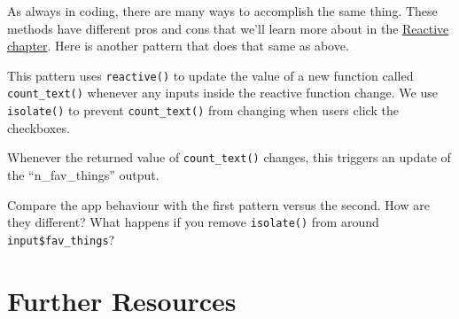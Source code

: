 \documentclass[
]{book}
\newenvironment{Shaded}{\begin{snugshade}}{\end{snugshade}}
\newcommand{\CommentTok}[1]{\textcolor[rgb]{0.56,0.35,0.01}{\textit{#1}}}
\newcommand{\ControlFlowTok}[1]{\textcolor[rgb]{0.13,0.29,0.53}{\textbf{#1}}}
\newcommand{\FunctionTok}[1]{\textcolor[rgb]{0.00,0.00,0.00}{#1}}
\newcommand{\NormalTok}[1]{#1}
\newcommand{\OtherTok}[1]{\textcolor[rgb]{0.56,0.35,0.01}{#1}}
\newcommand{\SpecialCharTok}[1]{\textcolor[rgb]{0.00,0.00,0.00}{#1}}
\newcommand{\StringTok}[1]{\textcolor[rgb]{0.31,0.60,0.02}{#1}}
\begin{document}
As always in coding, there are many ways to accomplish the same thing. These methods have different pros and cons that we'll learn more about in the \protect\hyperlink{reactives}{Reactive chapter}. Here is another pattern that does that same as above.

This pattern uses \texttt{reactive()} to update the value of a new function called \texttt{count\_text()} whenever any inputs inside the reactive function change. We use \texttt{isolate()} to prevent \texttt{count\_text()} from changing when users click the checkboxes.

Whenever the returned value of \texttt{count\_text()} changes, this triggers an update of the ``n\_fav\_things'' output.

\begin{Shaded}
\end{Shaded}

Compare the app behaviour with the first pattern versus the second. How are they different? What happens if you remove \texttt{isolate()} from around \texttt{input\$fav\_things}?

\hypertarget{resources-first-app}{%
\section{Further Resources}\label{resources-first-app}}
\end{document}
